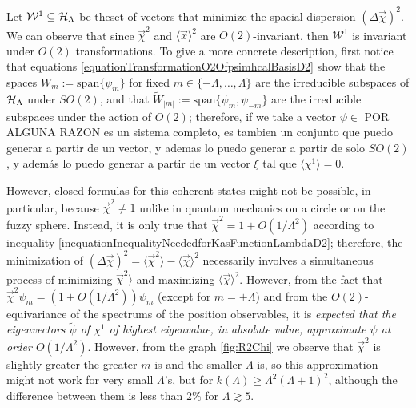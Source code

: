 Let $\mathcal{W}^1 \subseteq \mathcal H_\Lambda$ be theset of vectors that minimize the spacial dispersion $(\Delta \vec \chi)^2$. We can observe that since $\vec \chi^2$ and $\langle \vec x \rangle^2$ are $O(2)$-invariant, then $\mathcal W^1$ is invariant under $O(2)$ transformations. To give a more concrete description, first notice that equations \eqref{equationTransformationO2OfpsimhcalBasisD2} show that the spaces $W_m := \text{span}\{\psi_m\}$ for fixed $m \in \{-\Lambda, \dots, \Lambda\}$ are the irreducible subspaces of $\mathcal H_\Lambda$ under $SO(2)$, and that $\tilde W_{|m|} := \text{span}\{\psi_m, \psi_{-m}\}$ are the irreducible subspaces under the action of $O(2)$; therefore, if we take a vector $\psi \in $ POR ALGUNA RAZON es un sistema completo, es tambien un conjunto que puedo generar a partir de un vector, y ademas lo puedo generar a partir de solo $SO(2)$, y además lo puedo generar a partir de un vector $\xi$ tal que $\langle \chi^1 \rangle = 0$.

However, closed formulas for this coherent states might not be possible, in particular, because $\vec \chi^2 \neq 1$ unlike in quantum mechanics on a circle or on the fuzzy sphere. Instead, it is only true that $\vec \chi^2  = 1 + O(1/\Lambda^2)$ according to inequality \ref{inequationInequalityNeededforKasFunctionLambdaD2}; therefore, the minimization of $ (\Delta \vec \chi)^2 = \langle \vec \chi^2 \rangle - \langle \vec \chi \rangle ^2$ necessarily involves a simultaneous process of minimizing $\vec \chi^2 \rangle$ and maximizing $\langle \vec \chi\rangle ^2$. However, from the fact that $\vec \chi ^2 \psi_m  = (1 + O(1/\Lambda^2) )\psi_m$ (except for $m = \pm \Lambda$) and from the $O(2)$-equivariance of the spectrums of the position observables, it is \textit{expected \cite{FioreCoherent2020} that the eigenvectors $\tilde \psi$ of $\chi^1$ of highest eigenvalue, in absolute value, approximate $\psi$ at order $O(1/\Lambda^2)$}. However, from the graph \ref{fig:R2Chi} we observe that $\vec \chi^2$ is slightly greater the greater $m$ is and the smaller $\Lambda$ is, so this approximation might not work for very small $\Lambda$'s, but for $k(\Lambda) \geq \Lambda^2(\Lambda+1)^2$, although the difference between them is less than $2\%$ for $\Lambda \gtrsim 5$.

